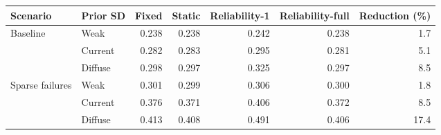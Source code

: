 \begin{tabular}{llrrrrr}
\toprule
Scenario & Prior SD & Fixed & Static & Reliability-1 & Reliability-full & Reduction (\%) \\
\midrule
Baseline & Weak & 0.238 & 0.238 & 0.242 & 0.238 & 1.7 \\
 & Current & 0.282 & 0.283 & 0.295 & 0.281 & 5.1 \\
 & Diffuse & 0.298 & 0.297 & 0.325 & 0.297 & 8.5 \\
\midrule
Sparse failures & Weak & 0.301 & 0.299 & 0.306 & 0.300 & 1.8 \\
 & Current & 0.376 & 0.371 & 0.406 & 0.372 & 8.5 \\
 & Diffuse & 0.413 & 0.408 & 0.491 & 0.406 & 17.4 \\
\bottomrule
\end{tabular}
